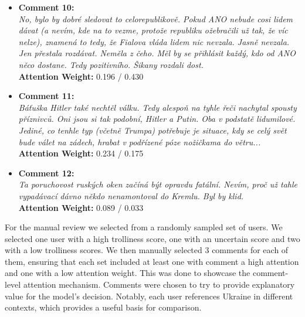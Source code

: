 \documentclass[twoside]{ctuthesis}
\theoremstyle{plain}
\theoremstyle{definition}
\theoremstyle{note}
\begin{document}
\begin{tcolorbox}[colback=white, colframe=black, title=User D - Trolliness Score: 0.159 (Multilingual Model) / 0.024 (Russian Model)]
\begin{itemize}
    \item \textbf{Comment 10:} \\
    \textit{No, bylo by dobré sledovat to celorepublikově. Pokud ANO nebude cosi lidem dávat (a nevím, kde na to vezme, protože republiku ožebračili už tak, že víc nelze), znamená to tedy, že Fialova vláda lidem nic nevzala. Jasně nevzala. Jen přestala rozdávat. Neměla z čeho. Měl by se přihlásit každý, kdo od ANO něco dostane. Tedy pozitivního. Šikany rozdali dost.} \\
    \textbf{Attention Weight:} 0.196 / 0.430

    \vspace{0.2cm}

    \item \textbf{Comment 11:} \\
    \textit{Báťuška Hitler také nechtěl válku. Tedy alespoň na tyhle řeči nachytal spousty příznivců. Oni jsou si tak podobní, Hitler a Putin. Oba v podstatě lidumilové. Jediné, co tenhle typ (včetně Trumpa) potřebuje je situace, kdy se celý svět bude válet na zádech, hrabat v podřízené póze nožičkama do větru...} \\
    \textbf{Attention Weight:} 0.234 / 0.175

    \vspace{0.2cm}

    \item \textbf{Comment 12:} \\
    \textit{Ta poruchovost ruských oken začíná být opravdu fatální. Nevím, proč už tahle vypadávací dávno někdo nenamontoval do Kremlu. Byl by klid.} \\
    \textbf{Attention Weight:} 0.089 / 0.033
\end{itemize}
\end{tcolorbox}

For the manual review we selected from a randomly sampled set of users. We selected one user with a high trolliness score, one with an uncertain score and two with a low trolliness scores. We then manually selected 3 comments for each of them, ensuring that each set included at least one with comment a high attention and one with a low attention weight. This was done to showcase the comment-level attention mechanism. Comments were chosen to try to provide explanatory value for the model's decision. Notably, each user references Ukraine in different contexts, which provides a useful basis for comparison.\par
\end{document}

